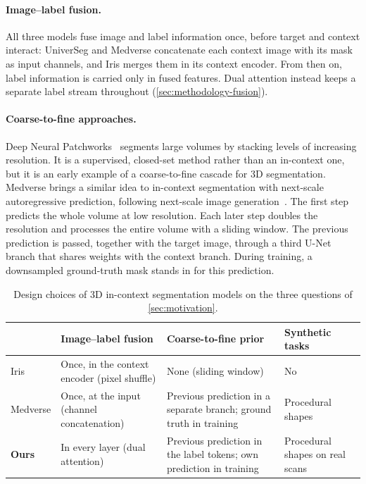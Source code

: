 \paragraph{Image--label fusion.}
All three models fuse image and label information once, before target and
context interact: UniverSeg and Medverse concatenate each context image with
its mask as input channels, and Iris merges them in its context encoder. From
then on, label information is carried only in fused features. Dual attention
instead keeps a separate label stream throughout
(\autoref{sec:methodology-fusion}).

\paragraph{Coarse-to-fine approaches.}
Deep Neural Patchworks~\cite{reisertDeepNeuralPatchworks2022a} segments large
volumes by stacking levels of increasing resolution. It is a supervised,
closed-set method rather than an in-context one, but it is an early example of
a coarse-to-fine cascade for 3D segmentation. Medverse brings a similar idea to
in-context segmentation with next-scale autoregressive prediction, following
next-scale image generation~\cite{tian2024visual}. The first step predicts the
whole volume at low resolution. Each later step doubles the resolution and
processes the entire volume with a sliding window. The previous prediction is
passed, together with the target image, through a third U-Net branch that
shares weights with the context branch. During training, a downsampled
ground-truth mask stands in for this prediction.

\begin{table}[t]
  \centering
  \small
  \caption{Design choices of 3D in-context segmentation models on the three
    questions of \autoref{sec:motivation}.}
  \label{tab:relatedwork}
  \begin{tabular}{@{} l p{4.2cm} p{4.4cm} p{3.4cm} @{}}
    \toprule
    & Image--label fusion & Coarse-to-fine prior & Synthetic tasks \\
    \midrule
    Iris & Once, in the context encoder (pixel shuffle) & None (sliding window) & No \\
    Medverse & Once, at the input (channel concatenation) & Previous prediction in a separate branch; ground truth in training & Procedural shapes \\
    \textbf{Ours} & In every layer (dual attention) & Previous prediction in the label tokens; own prediction in training & Procedural shapes on real scans \\
    \bottomrule
  \end{tabular}
\end{table}
